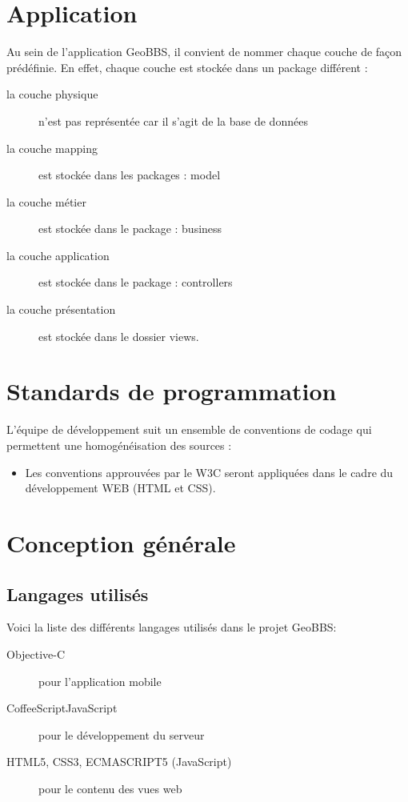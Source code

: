 \documentclass[a4paper,12pt]{report}
\begin{document}
\begin{onehalfspace}
\chapter{Application}
Au sein de l’application GeoBBS, il convient de nommer chaque couche de façon prédéfinie. En effet, chaque couche est stockée dans un package différent :
\begin{description}
\item[la couche physique] n’est pas représentée car il s’agit de la base de données
\item[la couche mapping] est stockée dans les packages : model
\item[la couche métier] est stockée dans le package : business
\item[la couche application] est stockée dans le package : controllers
\item[la couche présentation] est stockée dans le dossier views.
\end{description}

\chapter{Standards de programmation}
  L’équipe de développement suit un ensemble de conventions de codage qui permettent une homogénéisation des sources :
\begin{itemize}
  \item Les conventions approuvées par le W3C seront appliquées dans le cadre du développement WEB (HTML et CSS).
\end{itemize}

\chapter{Conception générale}
\section{Langages utilisés} %
\label{sub:langages_utilis_s}


Voici la liste des différents langages utilisés dans le projet GeoBBS:

\begin{description}
  \item[Objective-C] pour l'application mobile
  \item[CoffeeScript\/JavaScript] pour le développement du serveur
  \item[HTML5, CSS3, ECMASCRIPT5 (JavaScript)] pour le contenu des vues web
\end{description}


\end{onehalfspace}
\end{document}
